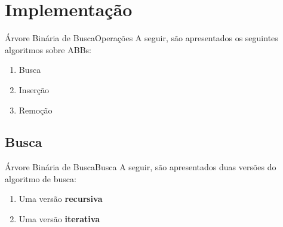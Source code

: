 \documentclass[aspectratio=169]{beamer}
\begin{document}
\section{Implementação}


\begin{frame}{Árvore Binária de Busca}{Operações}
A seguir, são apresentados os seguintes algoritmos sobre ABBs:
\begin{enumerate}
 \item Busca
 \item Inserção
 \item Remoção
\end{enumerate}
\end{frame}



\subsection{Busca}



\begin{frame}{Árvore Binária de Busca}{Busca}
A seguir, são apresentados duas versões do algoritmo de busca:
\begin{enumerate}
 \item Uma versão {\bf recursiva}
 \item Uma versão {\bf iterativa}
\end{enumerate}
\end{frame}

\end{document}
